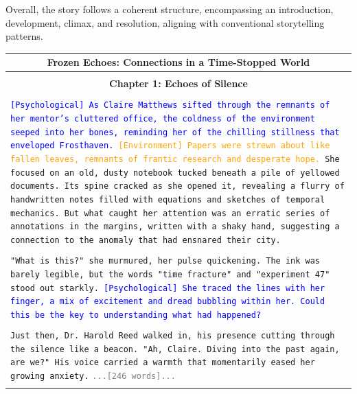 \documentclass[letterpaper]{article} %
\begin{document}
Overall, the story follows a coherent structure, encompassing an introduction, development, climax, and resolution, aligning with conventional storytelling patterns.

\onecolumn

\begin{small}
  \captionsetup{width=\textwidth}
  \begin{longtable}{p{\textwidth}}
    \toprule
    \multicolumn{1}{c}{\normalsize \textbf{Frozen Echoes: Connections in a Time-Stopped World}} \\
    \midrule \\
    \multicolumn{1}{c}{\normalsize \textbf{Chapter 1: Echoes of Silence}} \\\\

    \texttt{\textcolor{blue}{[Psychological] As Claire Matthews sifted through the remnants of her mentor's cluttered office, the coldness of the environment seeped into her bones, reminding her of the chilling stillness that enveloped Frosthaven.} \textcolor{orange}{[Environment] Papers were strewn about like fallen leaves, remnants of frantic research and desperate hope.} She focused on an old, dusty notebook tucked beneath a pile of yellowed documents. Its spine cracked as she opened it, revealing a flurry of handwritten notes filled with equations and sketches of temporal mechanics. But what caught her attention was an erratic series of annotations in the margins, written with a shaky hand, suggesting a connection to the anomaly that had ensnared their city.} \\\\

    \texttt{"What is this?" she murmured, her pulse quickening. The ink was barely legible, but the words "time fracture" and "experiment 47" stood out starkly. \textcolor{blue}{[Psychological] She traced the lines with her finger, a mix of excitement and dread bubbling within her. Could this be the key to understanding what had happened?}} \\\\

    \texttt{Just then, Dr. Harold Reed walked in, his presence cutting through the silence like a beacon. "Ah, Claire. Diving into the past again, are we?" His voice carried a warmth that momentarily eased her growing anxiety.}
    \texttt{\textcolor{gray}{...[246 words]...}} \\\\


\end{longtable}
\end{small}
\end{document}
